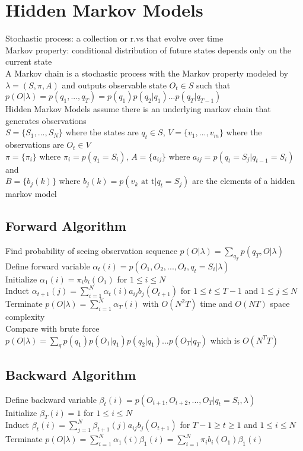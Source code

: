 \documentclass{article}
\renewcommand{\P}{p}
\begin{document}
\newpage
\section{Hidden Markov Models}
Stochastic process: a collection or r.vs that evolve over time \\
Markov property: conditional distribution of future states depends only on the current state \\
A Markov chain is a stochastic process with the Markov property modeled by $\lambda = (S, \pi, A)$ and outputs observable state $O_t \in S$ such that $\P(O | \lambda) = \P(q_1, ..., q_T) = \P(q_1)\P(q_2 | q_1)...\P(q_T | q_{T-1})$ \\
Hidden Markov Models assume there is an underlying markov chain that generates observations   \\
$S = \{S_1, ..., S_N\}$ where the states are $q_t \in S$, $V = \{v_1, ..., v_m\}$ where the observations are $O_t \in V$ \\
$\pi = \{\pi_i\}$ where $\pi_i = \P(q_1 = S_i)$, $A = \{a_{ij}\}$ where $a_{ij} = \P(q_t = S_j | q_{t-1} = S_i)$ and \\
$B = \{b_j(k)\}$ where $b_j(k) = \P(v_k \mbox{ at t} | q_t = S_j)$ are the elements of a hidden markov model

\subsection{Forward Algorithm}
Find probability of seeing observation sequence $p(O|\lambda) = \sum_{q_T} p(q_T, O | \lambda)$  \\
Define forward variable $\alpha_t(i) = \P(O_1, O_2, ..., O_t, q_t = S_i | \lambda)$ \\
Initialize $\alpha_1(i) = \pi_i b_i(O_1)$ for $1 \leq i \leq N$ \\
Induct $\alpha_{t+1}(j) = \sum_{i=1}^N \alpha_t(i)a_{ij} b_j(O_{t+1})$ for $1 \leq t \leq T -1$ and $1 \leq j \leq N$ \\
Terminate $\P(O | \lambda) = \sum_{i=1}^N \alpha_T(i)$ with $O(N^2T)$ time and $O(NT)$ space complexity \\
Compare with brute force $p(O|\lambda) =\sum_q p(q_1)p(O_1|q_1)p(q_2|q_1) \ldots p(O_T|q_T)$ which is $O(N^TT)$

\subsection{Backward Algorithm}
Define backward variable $\beta_t(i) = \P(O_{t+1}, O_{t+2}, ..., O_T | q_t = S_i, \lambda)$ \\
Initialize $\beta_T(i) = 1$ for $1 \leq i \leq N$ \\
Induct $\beta_{t}(i) = \sum_{j=1}^N \beta_{t+1}(j) a_{ij} b_j(O_{t+1})$ for $T-1 \geq t \geq 1$ and $1 \leq i \leq N$ \\
Terminate $p(O | \lambda) = \sum_{i=1}^N \alpha_1(i)\beta_1(i) = \sum_{i=1}^N  \pi_i b_i(O_1) \beta_1(i)$
\end{document}
